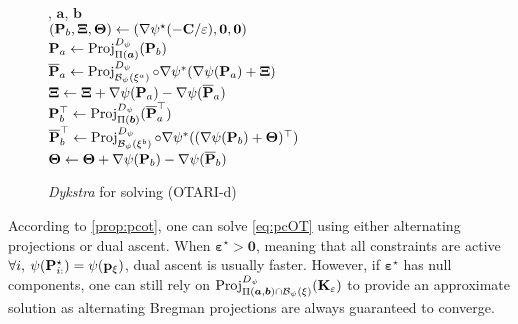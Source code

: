 \begin{wrapfigure}[15]{L}{0.52\textwidth}
  \begin{minipage}{0.52\textwidth}
\begin{algorithm}[H]
  \caption{\textit{Dykstra} for solving (OTARI-d)}
  \label{algo:Dykstra_pcot}
  \begin{algorithmic}[1]
      , $\bm{a}$, $\bm{b}$ \\
      \STATE $\left({\mathbf{P}}_b, \bm{\Xi}, \bm{\Theta} \right) \leftarrow \left(\nabla \psi^{\star}(-{\mathbf{C}} / \varepsilon), \mathbf{0}, \mathbf{0} \right)$ \\
          \STATE ${\mathbf{P}}_a \leftarrow \operatorname{Proj}^{D_\psi}_{\Pi(\bm{a})}({\mathbf{P}}_b)$ 
          \\
          \STATE $\overline{{\mathbf{P}}}_{a} \leftarrow \operatorname{Proj}^{D_\psi}_{\mathcal{B}_{\psi}(\xi^{a})}\circ \nabla \psi^*(\nabla \psi({\mathbf{P}}_a) + \bm{\Xi})$ 
          \\
          \STATE $\bm{\Xi} \leftarrow \bm{\Xi} + \nabla \psi({\mathbf{P}}_{a}) - \nabla \psi(\overline{{\mathbf{P}}}_{a})$
          \\
          \STATE ${\mathbf{P}}^\top_b \leftarrow \operatorname{Proj}^{D_\psi}_{\Pi(\bm{b})}(\overline{{\mathbf{P}}}_{a}^\top)$ 
          \\
          \STATE $\overline{{\mathbf{P}}}_{b}^\top \leftarrow \operatorname{Proj}^{D_\psi}_{\mathcal{B}_{\psi}(\xi^{b})}\circ \nabla \psi^*((\nabla \psi({\mathbf{P}}_b) + \bm{\Theta})^\top)$ 
          \\
          \STATE $\bm{\Theta} \leftarrow \bm{\Theta} + \nabla \psi({\mathbf{P}}_{b}) - \nabla \psi(\overline{{\mathbf{P}}}_{b})$
      \ENDWHILE  
\end{algorithmic}
\end{algorithm}
\end{minipage}
\end{wrapfigure}

According to \cref{prop:pcot}, one can solve \eqref{eq:pcOT} using either alternating projections or dual ascent. 
When $\bm{\varepsilon}^\star \bm{>} \bm{0}$, meaning that all constraints are active \ie $\forall i, \: \psi({\mathbf{P}}^\star_{i:}) = \psi(\mathbf{p}_{\xi})$, dual ascent is usually faster. However, if $\bm{\varepsilon}^\star$ has null components, one can still rely on $\operatorname{Proj}^{D_\psi}_{\Pi(\bm{a}, \bm{b}) \cap \mathcal{B}_\psi(\xi)}({\mathbf{K}}_\varepsilon)$ to provide an approximate solution as alternating Bregman projections are always guaranteed to converge.

